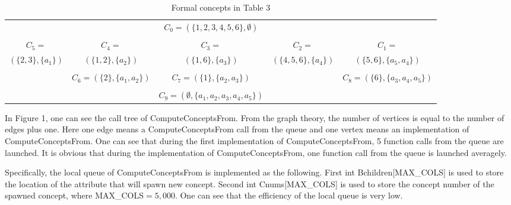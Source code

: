 \documentclass[11pt]{article}
\numberwithin{equation}{subsection}
\begin{document}
 \begin{table*}[ht]
            \begin{center}
                \begin{tiny}
                \caption{Formal concepts in  Table 3}
                    \label{table_4tab}
                    \begin{tabular}
                        {c c c c c }
                        \hline
                             &        &  $C_0=(\{1,2,3,4,5,6\},\emptyset)$  &     &  \ \ \  \\

                   &    &     &    &    \\
 $C_5= $ & $C_4= $   & $C_3= $  &  $C_2= $    &  $C_1= $  \\
 $(\{2,3\},\{a_1\})$ & $(\{1,2\},\{a_2\})$   & $(\{1,6\},\{a_3\})$  &  $(\{4,5,6\},\{a_4\})$    &  $(\{5,6\},\{a_5,a_4\})$  \\

   &    &     &      &   \\

  & $C_6=(\{2\},\{a_1, a_2\}) $  &  $C_7=(\{1\},\{a_2, a_3\}) $  & & $C_8=(\{6\},\{a_3, a_4, a_5\}) $      \\



   &    &     &     &    \\

 &  &    $C_9=(\emptyset,\{a_1, a_2, a_3 ,a_4, a_5\}) $   &   &   \\
\hline


                    \end{tabular}
                \end{tiny}
            \end{center}
        \end{table*}


In Figure 1, one can see the call tree of ComputeConceptsFrom. From the graph theory, the number of vertices is equal to the number of edges plus one. Here one edge means a ComputeConceptsFrom call  from the queue    and one vertex means an implementation of  ComputeConceptsFrom. One can see that during the first  implementation of  ComputeConceptsFrom,  5 function calls  from the queue are launched. It is obvious that
during the    implementation of  ComputeConceptsFrom,   one function call  from the queue is launched averagely.


Specifically, the local queue of ComputeConceptsFrom is implemented as the following. First int Bchildren[MAX\_COLS] is used to store the location of the attribute  that will spawn new concept. Second   int Cnums[MAX\_COLS] is used
to store the concept number of the spawned concept, where MAX\_COLS$=5,000$. One can see that the efficiency of the local queue is very low.
\end{document}
